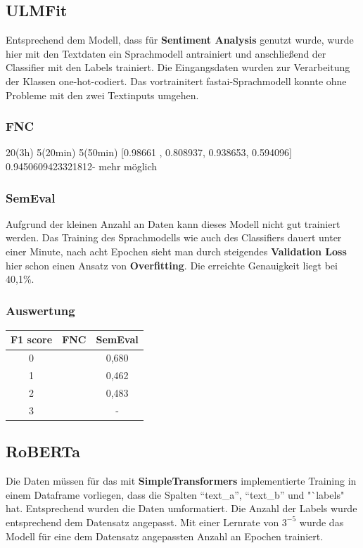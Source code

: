 \subsection{ULMFit}
Entsprechend dem Modell, dass f\"ur \textbf{Sentiment Analysis} genutzt wurde, wurde hier mit den Textdaten ein Sprachmodell antrainiert und anschlie{\ss}end der Classifier mit den Labels trainiert. Die Eingangsdaten wurden zur Verarbeitung der Klassen one-hot-codiert. Das vortrainitert fastai-Sprachmodell konnte ohne Probleme mit den zwei Textinputs umgehen.

\subsubsection*{FNC}
20(3h) 5(20min) 5(50min) [0.98661 , 0.808937, 0.938653, 0.594096] 0.9450609423321812-  mehr m\"oglich

\subsubsection*{SemEval}
Aufgrund der kleinen Anzahl an Daten kann dieses Modell nicht gut trainiert werden. Das Training des Sprachmodells wie auch des Classifiers dauert unter einer Minute, nach acht Epochen sieht man durch steigendes \textbf{Validation Loss} hier schon einen Ansatz von \textbf{Overfitting}. Die erreichte Genauigkeit liegt bei 40,1\%.

\subsubsection*{Auswertung}
\begin{center}
\begin{tabular}{|c||c|c|}
\hline
F1 score & FNC & SemEval\\ 
\hline\hline
0 &  & 0,680\\
\hline
1 &  & 0,462\\ 
\hline
2 &  & 0,483\\
\hline
3 &  & -\\
\hline    
\end{tabular}
\end{center}

\subsection{RoBERTa}
Die Daten m\"ussen f\"ur das mit \textbf{SimpleTransformers} implementierte Training in einem Dataframe vorliegen, dass die Spalten "`text\_a"', "`text\_b"' und "`labels"  hat. Entsprechend wurden die Daten umformatiert. Die Anzahl der Labels wurde entsprechend dem Datensatz angepasst. Mit einer Lernrate von $3^{-5}$ wurde das Modell f\"ur eine dem Datensatz angepassten Anzahl an Epochen trainiert.

